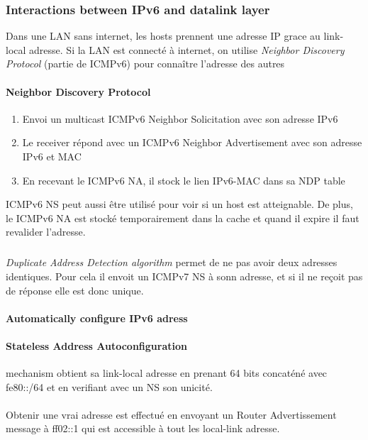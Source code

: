 \subsubsection{Interactions between IPv6 and datalink layer}

Dans une LAN sans internet, les hosts prennent une adresse IP grace au link-local adresse.
Si la LAN est connecté à internet, on utilise \textit{Neighbor Discovery Protocol} (partie de ICMPv6) pour connaître l'adresse des autres

\paragraph{Neighbor Discovery Protocol}

\begin{enumerate}
    \item Envoi un multicast ICMPv6 Neighbor Solicitation avec son adresse IPv6
    \item Le receiver répond avec un ICMPv6 Neighbor Advertisement avec son adresse IPv6 et MAC
    \item En recevant le ICMPv6 NA, il stock le lien IPv6-MAC dans sa NDP table
\end{enumerate}
ICMPv6 NS peut aussi être utilisé pour voir si un host est atteignable. De plus, le ICMPv6 NA est
stocké temporairement dans la cache et quand il expire il faut revalider l'adresse.

\subparagraph{ }
\textit{Duplicate Address Detection algorithm} permet de ne pas avoir deux adresses identiques.
Pour cela il envoit un ICMPv7 NS à sonn adresse, et si il ne reçoit pas de réponse elle est
donc unique.

\paragraph{Automatically configure IPv6 adress}
\paragraph{Stateless Address Autoconfiguration} mechanism obtient sa link-local adresse
en prenant 64 bits concaténé avec fe80::/64 et en verifiant avec un NS son unicité.

\paragraph{ }
Obtenir  une   vrai  adresse  est   effectué  en  envoyant   un  Router
Advertissement  message  à  ff02::1  qui est  accessible  à  tout  les
local-link adresse.

